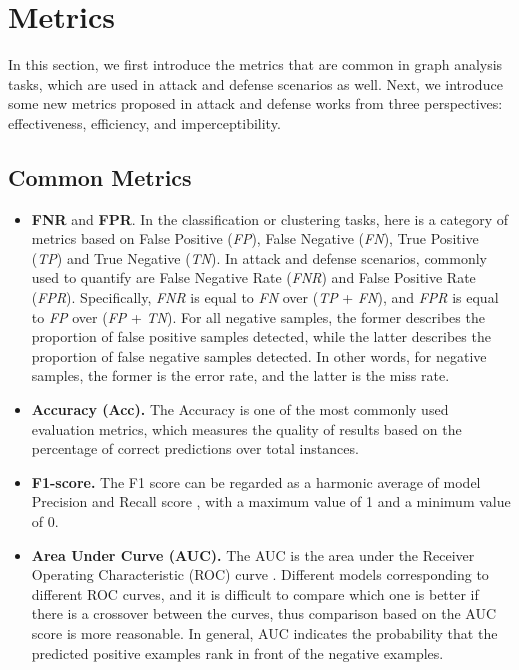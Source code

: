 
\section{Metrics}
\label{metrics}
In this section, we first introduce the metrics that are common in graph analysis tasks, which are used in attack and defense scenarios as well. Next, we introduce some new metrics proposed in attack and defense works from three perspectives: effectiveness, efficiency, and imperceptibility.
\subsection{Common Metrics}
\begin{itemize}
	\item \textbf{FNR} and \textbf{FPR}. In the classification or clustering tasks, here is a category of metrics based on False Positive (\textit{FP}), False Negative (\textit{FN}), True Positive (\textit{TP}) and True Negative (\textit{TN}). In attack and defense scenarios, commonly used to quantify are False Negative Rate (\textit{FNR}) and False Positive Rate (\textit{FPR}). Specifically, \textit{FNR} is equal to \textit{FN} over (\textit{TP} + \textit{FN}), and \textit{FPR} is equal to \textit{FP} over (\textit{FP} + \textit{TN}). For all negative samples, the former describes the proportion of false positive samples detected, while the latter describes the proportion of false negative samples detected. In other words, for negative samples, the former is the error rate, and the latter is the miss rate.
	\item \textbf{Accuracy (Acc).} The Accuracy is one of the most commonly used evaluation metrics, which measures the quality of results based on the percentage of correct predictions over total instances.
	\item \textbf{F1-score.} The F1 score \cite{bojchevski2019adversarial} can be regarded as a harmonic average of model Precision and Recall score \cite{powers2011evaluation}, with a maximum value of 1 and a minimum value of 0.
	\item \textbf{Area Under Curve (AUC).} The AUC is the area under the Receiver Operating Characteristic (ROC) curve \cite{zhang2019comparing}. Different models corresponding to different ROC curves, and it is difficult to compare which one is better if there is a crossover between the curves, thus comparison based on the AUC score is more reasonable. In general, AUC indicates the probability that the predicted positive examples rank in front of the negative examples.


\end{itemize}
